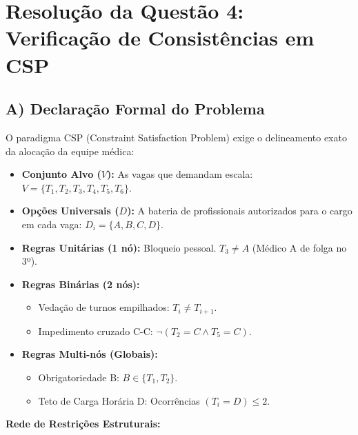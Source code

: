 \section*{Resolução da Questão 4: Verificação de Consistências em CSP}

\subsection*{A) Declaração Formal do Problema}

O paradigma CSP (Constraint Satisfaction Problem) exige o delineamento exato da alocação da equipe médica:

\begin{itemize}
    \item \textbf{Conjunto Alvo ($V$):} As vagas que demandam escala: $V = \{T_1, T_2, T_3, T_4, T_5, T_6\}$.
    \item \textbf{Opções Universais ($D$):} A bateria de profissionais autorizados para o cargo em cada vaga: $D_i = \{A, B, C, D\}$.
    \item \textbf{Regras Unitárias (1 nó):} Bloqueio pessoal. $T_3 \neq A$ (Médico A de folga no 3º).
    \item \textbf{Regras Binárias (2 nós):} 
    \begin{itemize}
        \item Vedação de turnos empilhados: $T_i \neq T_{i+1}$.
        \item Impedimento cruzado C-C: $\neg(T_2 = C \land T_5 = C)$.
    \end{itemize}
    \item \textbf{Regras Multi-nós (Globais):}
    \begin{itemize}
        \item Obrigatoriedade B: $B \in \{T_1, T_2\}$.
        \item Teto de Carga Horária D: Ocorrências $(T_i = D) \leq 2$.
    \end{itemize}
\end{itemize}

\textbf{Rede de Restrições Estruturais:}

\begin{center}
\end{center}

